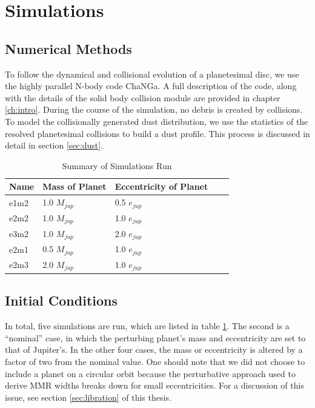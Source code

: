 \section{Simulations} \label{sec:sims}

\subsection{Numerical Methods}\label{sec:methods}

To follow the dynamical and collisional evolution of a planetesimal disc, we use the highly parallel N-body code {\sc ChaNGa}. A full 
description of the code, along with the details of the solid body collision module are provided in chapter \ref{ch:intro}. During the course 
of the simulation, no debris is created by collisions. To model the collisionally generated dust distribution, we use the statistics of the 
resolved planetesimal collisions to build a dust profile. This process is discussed in detail in section \ref{sec:dust}.

\begin{table}
\begin{center}
\caption{Summary of Simulations Run}
\begin{tabular}{lllll} \hline \hline
Name     & Mass of Planet & Eccentricity of Planet &  &  \\ \hline
e1m2 & 1.0 $M_{jup}$                     & 0.5 $e_{jup}$                            &  &  \\
e2m2      & 1.0 $M_{jup}$                     & 1.0 $e_{jup}$                             &  &  \\
e3m2 & 1.0 $M_{jup}$                     & 2.0 $e_{jup}$                             &  &  \\
e2m1 & 0.5 $M_{jup}$                   & 1.0 $e_{jup}$                             &  &  \\
e2m3 & 2.0 $M_{jup}$                     & 1.0 $e_{jup}$                             &  &  \\ \hline
\end{tabular}
\label{tab:sims}
\end{center}
\end{table}

\subsection{Initial Conditions}\label{sec:jup_ics}

In total, five simulations are run, which are listed in table \ref{tab:sims}. The second is a ``nominal'' case, in which the perturbing 
planet's mass and eccentricity are set to that of Jupiter's. In the other four cases, the mass or eccentricity is altered by a factor of 
two from the nominal value. One should note that we did not choose to include a planet on a circular orbit because the perturbative approach used to derive MMR widths breaks down for small eccentricities. For a discussion of this issue, see section \ref{sec:libration} of this thesis.


